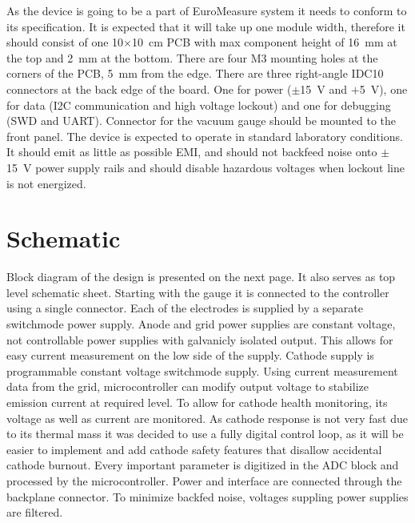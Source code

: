 \documentclass{article}
\begin{document}
As the device is going to be a part of EuroMeasure system it needs to conform to its specification.
It is expected that it will take up one module width, therefore it should consist of one \num{10}$\times$\SI{10}{\centi\meter} PCB with max
component height of \SI{16}{\milli\meter} at the top and \SI{2}{\milli\meter} at the bottom. There are four M3 mounting holes at the corners of the PCB, \SI{5}{\milli\meter} from the edge.
There are three right-angle IDC10 connectors at the back edge of the board. One for power ($\pm$\SI{15}{\volt} and $+$\SI{5}{\volt}), one for data (I2C communication and high voltage lockout) and one for debugging (SWD and UART).
Connector for the vacuum gauge should be mounted to the front panel. The device is expected to operate in standard laboratory conditions.
It should emit as little as possible EMI, and should not backfeed noise onto $\pm$\SI{15}{\volt} power supply rails and should disable hazardous voltages when lockout line is not energized.

\section{Schematic}

Block diagram of the design is presented on the next page. It also serves as top level schematic sheet.
Starting with the gauge it is connected to the controller using a single connector. Each of the electrodes is supplied by a separate switchmode power supply.
Anode and grid power supplies are constant voltage, not controllable power supplies with galvanicly isolated output. This allows for easy current measurement on the low side of the supply.
Cathode supply is programmable constant voltage switchmode supply. Using current measurement data from the grid, microcontroller can modify output voltage to stabilize emission current at required level.
To allow for cathode health monitoring, its voltage as well as current are monitored.
As cathode response is not very fast due to its thermal mass it was decided to use a fully digital control loop, as it will be easier to implement and add cathode safety features that disallow accidental cathode burnout.
Every important parameter is digitized in the ADC block and processed by the microcontroller. Power and interface are connected through the backplane connector.
To minimize backfed noise, voltages suppling power supplies are filtered.


\end{document}
